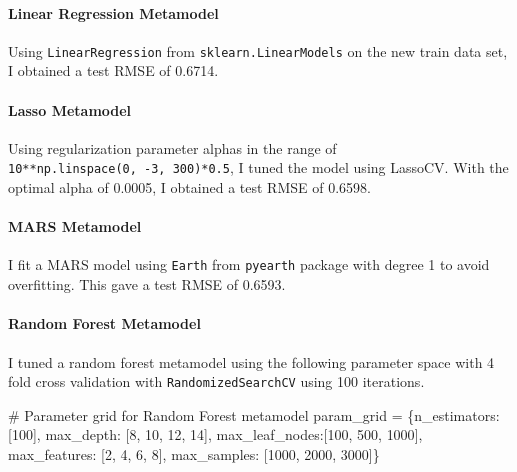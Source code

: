 \documentclass[
  letterpaper,
  DIV=11,
  numbers=noendperiod]{scrartcl}
\let\oldparagraph\paragraph
\renewcommand{\paragraph}[1]{\oldparagraph{#1}\mbox{}}
\newenvironment{Shaded}{\begin{snugshade}}{\end{snugshade}}
\newcommand{\CommentTok}[1]{\textcolor[rgb]{0.37,0.37,0.37}{#1}}
\newcommand{\DecValTok}[1]{\textcolor[rgb]{0.68,0.00,0.00}{#1}}
\newcommand{\NormalTok}[1]{\textcolor[rgb]{0.00,0.23,0.31}{#1}}
\newcommand{\OperatorTok}[1]{\textcolor[rgb]{0.37,0.37,0.37}{#1}}
\newcommand{\StringTok}[1]{\textcolor[rgb]{0.13,0.47,0.30}{#1}}
\begin{document}
\hypertarget{linear-regression-metamodel}{%
\paragraph{Linear Regression
Metamodel}\label{linear-regression-metamodel}}

Using \texttt{LinearRegression} from \texttt{sklearn.LinearModels} on
the new train data set, I obtained a test RMSE of 0.6714.

\hypertarget{lasso-metamodel}{%
\paragraph{Lasso Metamodel}\label{lasso-metamodel}}

Using regularization parameter alphas in the range of
\texttt{10**np.linspace(0,\ -3,\ 300)*0.5}, I tuned the model using
LassoCV. With the optimal alpha of 0.0005, I obtained a test RMSE of
0.6598.

\hypertarget{mars-metamodel}{%
\paragraph{MARS Metamodel}\label{mars-metamodel}}

I fit a MARS model using \texttt{Earth} from \texttt{pyearth} package
with degree 1 to avoid overfitting. This gave a test RMSE of 0.6593.

\hypertarget{random-forest-metamodel}{%
\paragraph{Random Forest Metamodel}\label{random-forest-metamodel}}

I tuned a random forest metamodel using the following parameter space
with 4 fold cross validation with \texttt{RandomizedSearchCV} using 100
iterations.

\begin{Shaded}
\begin{Highlighting}[]
\CommentTok{\# Parameter grid for Random Forest metamodel}
\NormalTok{param\_grid }\OperatorTok{=}\NormalTok{ \{}\StringTok{\textquotesingle{}n\_estimators\textquotesingle{}}\NormalTok{: [}\DecValTok{100}\NormalTok{],}
              \StringTok{\textquotesingle{}max\_depth\textquotesingle{}}\NormalTok{: [}\DecValTok{8}\NormalTok{, }\DecValTok{10}\NormalTok{, }\DecValTok{12}\NormalTok{, }\DecValTok{14}\NormalTok{],}
              \StringTok{\textquotesingle{}max\_leaf\_nodes\textquotesingle{}}\NormalTok{:[}\DecValTok{100}\NormalTok{, }\DecValTok{500}\NormalTok{, }\DecValTok{1000}\NormalTok{],}
              \StringTok{\textquotesingle{}max\_features\textquotesingle{}}\NormalTok{: [}\DecValTok{2}\NormalTok{, }\DecValTok{4}\NormalTok{, }\DecValTok{6}\NormalTok{, }\DecValTok{8}\NormalTok{],}
              \StringTok{\textquotesingle{}max\_samples\textquotesingle{}}\NormalTok{: [}\DecValTok{1000}\NormalTok{, }\DecValTok{2000}\NormalTok{, }\DecValTok{3000}\NormalTok{]\}}
\end{Highlighting}
\end{Shaded}
\end{document}
